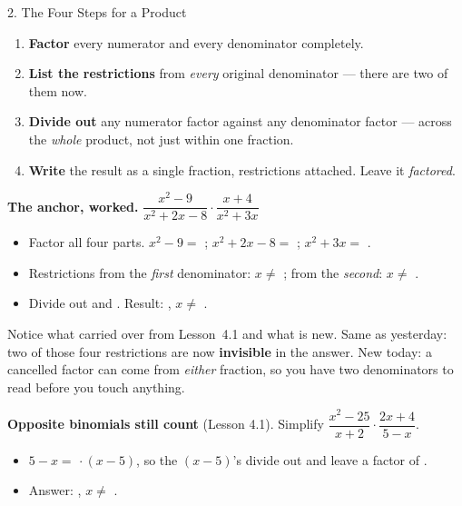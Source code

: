 \documentclass[10pt]{article}
\begin{document}
\begin{notesbox}{2. The Four Steps for a Product}
\begin{enumerate}[leftmargin=1.9em, itemsep=2pt]
  \item \textbf{Factor} every numerator and every denominator completely.
  \item \textbf{List the restrictions} from \emph{every} original denominator --- there are two of them now.
  \item \textbf{Divide out} any numerator factor against any denominator factor --- across the \emph{whole} product, not just within one fraction.
  \item \textbf{Write} the result as a single fraction, restrictions attached. Leave it \emph{factored}.
\end{enumerate}

\vspace{4pt}
\textbf{The anchor, worked.} \; $\dfrac{x^2-9}{x^2+2x-8}\cdot\dfrac{x+4}{x^2+3x}$
\begin{itemize}[leftmargin=1.5em, itemsep=3pt]
  \item Factor all four parts. \; $x^2-9=$ \blank{2.6cm}; \quad $x^2+2x-8=$ \blank{2.6cm};
        \quad $x^2+3x=$ \blank{2.2cm}.
  \item Restrictions from the \emph{first} denominator: $x\neq$ \blank{1.8cm}; \; from the
        \emph{second}: $x\neq$ \blank{1.8cm}.
  \item Divide out \blank{1.4cm} and \blank{1.4cm}. \; Result: \blank{2.6cm}, \;
        $x\neq$ \blank{3.0cm}.
\end{itemize}

\vspace{3pt}
Notice what carried over from Lesson~4.1 and what is new. Same as yesterday: two of those four
restrictions are now \textbf{invisible} in the answer. New today: a cancelled factor can come from
\emph{either} fraction, so you have two denominators to read before you touch anything.

\vspace{5pt}
\textbf{Opposite binomials still count} (Lesson 4.1). Simplify
$\dfrac{x^2-25}{x+2}\cdot\dfrac{2x+4}{5-x}$.
\begin{itemize}[leftmargin=1.5em, itemsep=3pt]
  \item $5-x=$ \blank{2.0cm} $\cdot\,(x-5)$, so the $(x-5)$'s divide out and leave a factor of
        \blank{1.0cm}.
  \item Answer: \blank{2.4cm}, \; $x\neq$ \blank{1.8cm}.
\end{itemize}
\end{notesbox}
\end{document}
